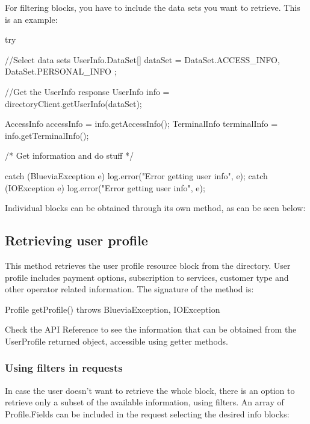 For filtering blocks, you have to include the data sets you want to retrieve. This is an example:


\begin{DoxyCode}
try {
        //Select data sets
        UserInfo.DataSet[] dataSet = {DataSet.ACCESS_INFO, DataSet.PERSONAL_INFO}
      ;
        
        //Get the UserInfo response
        UserInfo info = directoryClient.getUserInfo(dataSet);

        AccessInfo accessInfo = info.getAccessInfo();
        TerminalInfo terminalInfo = info.getTerminalInfo();     
        
        /* Get information and do stuff */
          
} catch (BlueviaException e) {
        log.error("Error getting user info", e);
} catch (IOException e) {
        log.error("Error getting user info", e);
}
\end{DoxyCode}


Individual blocks can be obtained through its own method, as can be seen below:\hypertarget{blv_directory_guide_retrieving_user_profile_sec}{}\subsection{Retrieving user profile}\label{blv_directory_guide_retrieving_user_profile_sec}
This method retrieves the user profile resource block from the directory. User profile includes payment options, subscription to services, customer type and other operator related information. The signature of the method is:


\begin{DoxyCode}
Profile getProfile() throws BlueviaException, IOException
\end{DoxyCode}


Check the API Reference to see the information that can be obtained from the UserProfile returned object, accessible using getter methods.\hypertarget{blv_directory_guide_retrieving_user_profile_using_filters_sec}{}\subsubsection{Using filters in requests}\label{blv_directory_guide_retrieving_user_profile_using_filters_sec}
In case the user doesn't want to retrieve the whole block, there is an option to retrieve only a subset of the available information, using filters. An array of Profile.Fields can be included in the request selecting the desired info blocks:


